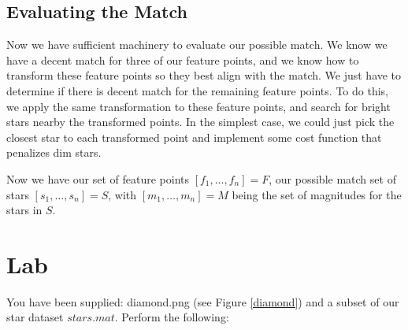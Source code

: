 \documentclass[paper=a4, fontsize=11pt]{scrartcl} %
\begin{document}
\subsection{Evaluating the Match}

Now we have sufficient machinery to evaluate our possible match.  We know we have a decent match for three of our feature points, and we know how to transform these feature points so they best align with the match. We just have to determine if there is decent match for the remaining feature points. To do this, we apply the same transformation to these feature points, and search for bright stars nearby the transformed points. In the simplest case, we could just pick the closest star to each transformed point and implement some cost function that penalizes dim stars.

Now we have our set of feature points $[f_1,\ldots,f_n]=F$, our possible match set of stars $[s_1,\ldots,s_n] = S$, with $[m_1,\ldots,m_n] = M$ being the set of magnitudes for the stars in $S$.




\section{Lab}
You have been supplied: diamond.png (see Figure \ref{diamond}) and a subset of our star dataset $stars.mat$. Perform the following: 
\end{document}
